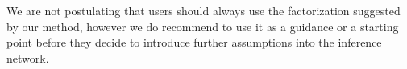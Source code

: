 \documentclass[12pt]{article}
\begin{document}
We are not postulating that users should always use the factorization suggested by our method,
however we do recommend to use it as a guidance or a starting point before they decide to
introduce further assumptions into the inference network.



\end{document}
